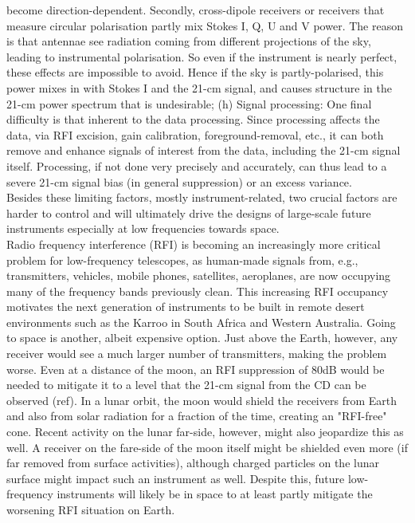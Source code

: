 become direction-dependent. Secondly, cross-dipole receivers or receivers that measure circular polarisation partly mix Stokes I, Q, U and V power. The reason is that antennae see radiation coming from different projections of the sky, leading to instrumental polarisation. So even if the instrument is nearly perfect, these effects are impossible to avoid. Hence if the sky is partly-polarised, this power mixes in with Stokes I and the 21-cm signal, and causes structure in the 21-cm power spectrum that is undesirable; {(h) Signal processing:} One final difficulty is that inherent to the data processing. Since processing affects the data, via RFI excision, gain calibration, foreground-removal, etc., it can both remove and enhance signals of interest from the data, including the 21-cm signal itself. Processing, if not done very precisely and accurately,  can thus lead to a severe 21-cm signal bias (in general suppression) or an excess variance.  
\\ 

\noindent Besides these limiting factors, mostly instrument-related, two crucial factors are harder to control and will ultimately drive the designs of large-scale future instruments especially at low frequencies towards space.\\

 Radio frequency interference (RFI) is becoming an increasingly more critical problem for low-frequency telescopes, as human-made signals from, e.g., transmitters, vehicles, mobile phones, satellites, aeroplanes, are now occupying many of the frequency bands previously clean. This increasing RFI occupancy motivates the next generation of instruments to be built in remote desert environments such as the Karroo in South Africa and Western Australia. Going to space is another, albeit expensive option. Just above the Earth, however, any receiver would see a much larger number of transmitters, making the problem worse. Even at a distance of the moon, an RFI suppression of 80dB would be needed to mitigate it to a level that the 21-cm signal from the CD can be observed (ref). In a lunar orbit, the moon would shield the receivers from Earth and also from solar radiation for a fraction of the time, creating an "RFI-free" cone. Recent activity on the lunar far-side, however, might also jeopardize this as well. A receiver on the fare-side of the moon itself might be shielded even more (if far removed from surface activities), although charged particles on the lunar surface might impact such an instrument as well. Despite this, future low-frequency instruments will likely be in space to at least partly mitigate the worsening RFI situation on Earth. \\

